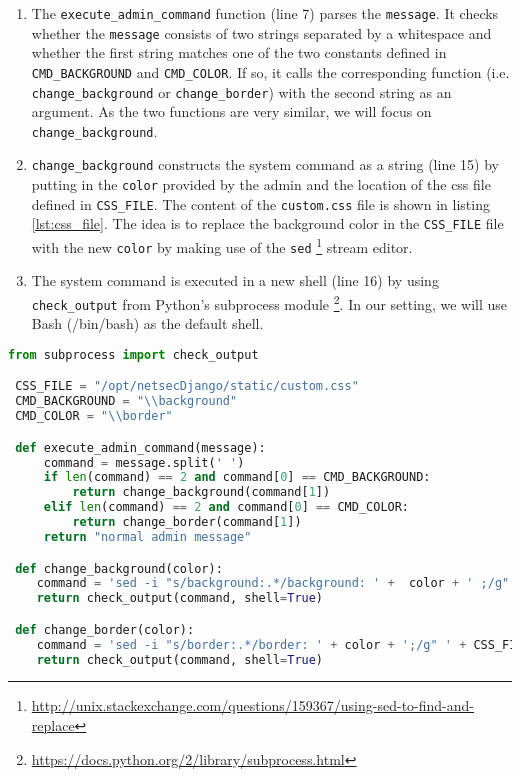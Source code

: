 \documentclass[12pt,a4paper]{article}
\newcommand{\code}[1]{\texttt{#1}}
\begin{document}
\begin{enumerate}
\item The \code{execute\_admin\_command} function (line 7) parses the \code{message}. It checks whether the \code{message} consists of two strings separated by a whitespace and whether the first string matches one of the two constants defined in \code{CMD\_BACKGROUND} and \code{CMD\_COLOR}. If so, it calls the corresponding function (i.e. \code{change\_background} or \code{change\_border}) with the second string as an argument. As the two functions are very similar, we will focus on \code{change\_background}.

\item \code{change\_background} constructs the system command as a string (line 15) by putting in the \code{color} provided by the admin and the location of the css file defined in \code{CSS\_FILE}. The content of the \code{custom.css} file is shown in listing \ref{lst:css_file}. The idea is to replace the background color in the \code{CSS\_FILE} file with the new \code{color} by making use of the \code{sed} \footnote{\url{http://unix.stackexchange.com/questions/159367/using-sed-to-find-and-replace}} stream editor.

\item  The system command is executed in a new shell (line 16) by using \code{check\_output} from Python's subprocess module \footnote{\url{https://docs.python.org/2/library/subprocess.html}}. In our setting, we will use Bash (/bin/bash) as the default shell.
\end{enumerate}


\begin{lstlisting}[caption={Excerpt of the command injection vulnerability implementation},label={lst:admin_command}, language=python] 
 from subprocess import check_output

 CSS_FILE = "/opt/netsecDjango/static/custom.css"
 CMD_BACKGROUND = "\\background"
 CMD_COLOR = "\\border"

 def execute_admin_command(message):
     command = message.split(' ')
     if len(command) == 2 and command[0] == CMD_BACKGROUND:
         return change_background(command[1])
     elif len(command) == 2 and command[0] == CMD_COLOR:
         return change_border(command[1])
     return "normal admin message"

 def change_background(color):
    command = 'sed -i "s/background:.*/background: ' +  color + ' ;/g" ' + CSS_FILE
    return check_output(command, shell=True)

 def change_border(color):
    command = 'sed -i "s/border:.*/border: ' + color + ';/g" ' + CSS_FILE
    return check_output(command, shell=True)
\end{lstlisting}
\end{document}

